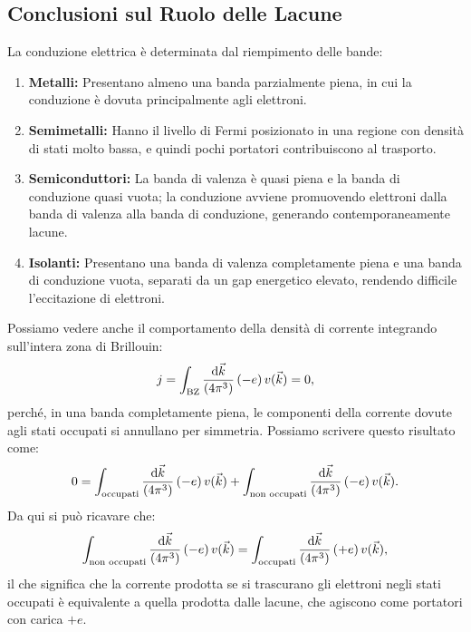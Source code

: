 \subsection*{Conclusioni sul Ruolo delle Lacune}
La conduzione elettrica è determinata dal riempimento delle bande:
\begin{enumerate}
    \item \textbf{Metalli:} Presentano almeno una banda parzialmente piena, in cui la conduzione è dovuta principalmente agli elettroni.
    \item \textbf{Semimetalli:} Hanno il livello di Fermi posizionato in una regione con densità di stati molto bassa, e quindi pochi portatori contribuiscono al trasporto.
    \item \textbf{Semiconduttori:} La banda di valenza è quasi piena e la banda di conduzione quasi vuota; la conduzione avviene promuovendo elettroni dalla banda di valenza alla banda di conduzione, generando contemporaneamente lacune.
    \item \textbf{Isolanti:} Presentano una banda di valenza completamente piena e una banda di conduzione vuota, separati da un gap energetico elevato, rendendo difficile l'eccitazione di elettroni.
\end{enumerate}
Possiamo vedere anche il comportamento della densità di corrente integrando sull'intera zona di Brillouin:
\[
j = \int_{\text{BZ}} \frac{\text{d}\vec{k}}{(4\pi^3)}\, (-e)\, v(\vec{k}) = 0,
\]
perché, in una banda completamente piena, le componenti della corrente dovute agli stati occupati si annullano per simmetria. Possiamo scrivere questo risultato come:
\[
0 = \int_{\text{occupati}} \frac{\text{d}\vec{k}}{(4\pi^3)}\, (-e)\, v(\vec{k}) + \int_{\text{non occupati}} \frac{\text{d}\vec{k}}{(4\pi^3)}\, (-e)\, v(\vec{k}).
\]
Da qui si può ricavare che:
\[
\int_{\text{non occupati}} \frac{\text{d}\vec{k}}{(4\pi^3)}\, (-e)\, v(\vec{k}) = \int_{\text{occupati}} \frac{\text{d}\vec{k}}{(4\pi^3)}\, (+e)\, v(\vec{k}),
\]
il che significa che la corrente prodotta se si trascurano gli elettroni negli stati occupati è equivalente a quella prodotta dalle lacune, che agiscono come portatori con carica \(+e\).

